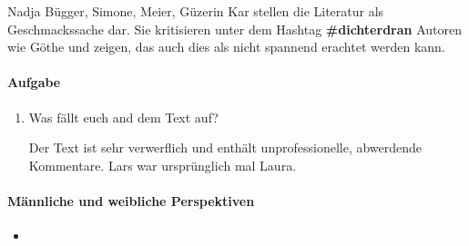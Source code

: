 \documentclass{article}
\begin{document}
Nadja Bügger, Simone, Meier, Güzerin Kar stellen die Literatur als Geschmackssache dar. Sie kritisieren unter dem Hashtag \textbf{\#dichterdran} Autoren wie Göthe und zeigen, das auch dies als nicht spannend erachtet werden kann.

\paragraph{Aufgabe}
\begin{enumerate}
    \item Was fällt euch and dem Text auf?

    Der Text ist sehr verwerflich und enthält unprofessionelle, abwerdende Kommentare. Lars war ursprünglich mal Laura.
\end{enumerate}

\paragraph{Männliche und weibliche Perspektiven}
\begin{itemize}
    \item 
\end{itemize}
\end{document}
